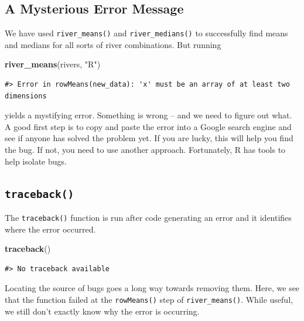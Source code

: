 \documentclass[
]{book}
\newenvironment{Shaded}{\begin{snugshade}}{\end{snugshade}}
\newcommand{\KeywordTok}[1]{\textcolor[rgb]{0.13,0.29,0.53}{\textbf{#1}}}
\newcommand{\NormalTok}[1]{#1}
\newcommand{\StringTok}[1]{\textcolor[rgb]{0.31,0.60,0.02}{#1}}
\begin{document}
\hypertarget{a-mysterious-error-message}{%
\subsection{A Mysterious Error Message}\label{a-mysterious-error-message}}

We have used \texttt{river\_means()} and \texttt{river\_medians()} to successfully find means and medians for all sorts of river combinations. But running

\begin{Shaded}
\begin{Highlighting}[]
\KeywordTok{river_means}\NormalTok{(rivers, }\StringTok{"R"}\NormalTok{)}
\end{Highlighting}
\end{Shaded}

\begin{verbatim}
#> Error in rowMeans(new_data): 'x' must be an array of at least two dimensions
\end{verbatim}

yields a mystifying error. Something is wrong -- and we need to figure out what. A good first step is to copy and paste the error into a Google search engine and see if anyone has solved the problem yet. If you are lucky, this will help you find the bug. If not, you need to use another approach. Fortunately, R has tools to help isolate bugs.

\hypertarget{traceback}{%
\subsection{\texorpdfstring{\texttt{traceback()}}{traceback()}}\label{traceback}}

The \texttt{traceback()} function is run after code generating an error and it identifies where the error occurred.

\begin{Shaded}
\begin{Highlighting}[]
\KeywordTok{traceback}\NormalTok{()}
\end{Highlighting}
\end{Shaded}

\begin{verbatim}
#> No traceback available
\end{verbatim}

Locating the source of bugs goes a long way towards removing them. Here, we see that the function failed at the \texttt{rowMeans()} step of \texttt{river\_means()}. While useful, we still don't exactly know why the error is occurring.
\end{document}

